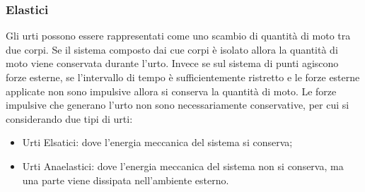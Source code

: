 \documentclass{article}
\numberwithin{equation}{subsection}
\begin{document}
\subsubsection{Elastici}
Gli urti possono essere rappresentati come uno scambio di quantità di moto tra due corpi. 
Se il sistema composto dai cue corpi è isolato allora la quantità di 
moto viene conservata durante l'urto. Invece se sul sistema di punti agiscono forze esterne, se l'intervallo di tempo è sufficientemente ristretto e le forze esterne applicate 
non sono impulsive allora si conserva la quantità di moto. Le forze impulsive che generano l'urto non sono necessariamente conservative, per cui si considerando 
due tipi di urti: 
\begin{itemize}
    \item Urti Elsatici: dove l'energia meccanica del sistema si conserva;
    \item Urti Anaelastici: dove l'energia meccanica del sistema non si conserva, ma una parte viene dissipata nell'ambiente esterno.
\end{itemize}
\end{document}
